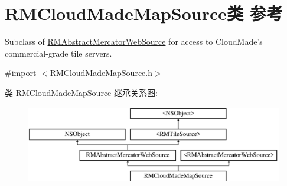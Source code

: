 \hypertarget{interface_r_m_cloud_made_map_source}{\section{R\-M\-Cloud\-Made\-Map\-Source类 参考}
\label{interface_r_m_cloud_made_map_source}
}


Subclass of \hyperlink{interface_r_m_abstract_mercator_web_source}{R\-M\-Abstract\-Mercator\-Web\-Source} for access to Cloud\-Made's commercial-\/grade tile servers.  




{\ttfamily \#import $<$R\-M\-Cloud\-Made\-Map\-Source.\-h$>$}

类 R\-M\-Cloud\-Made\-Map\-Source 继承关系图\-:\begin{figure}[H]
\begin{center}
\leavevmode
\includegraphics[height=3.425076cm]{interface_r_m_cloud_made_map_source}
\end{center}
\end{figure}
